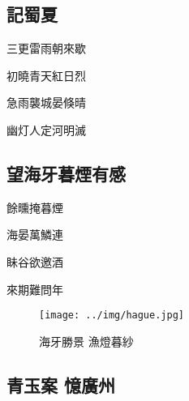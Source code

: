 \documentclass[a4j,12pt]{ltjtarticle}
\begin{document}
\begin{center}
	\newpage
	\begin{flushleft}
		\section{記蜀夏}
	\end{flushleft}
	
	\vfill
	\LARGE 三更雷雨朝來歇\par

	初曉青天紅日烈\par 

	急雨襲城晏倏晴\par

	幽灯人定河明滅\par
	\vspace{1.5cm} %
	\vfill





	\newpage
	\begin{flushleft}
		\section{望海牙暮煙有感}
	\end{flushleft}
	
	\vfill
	\LARGE 餘曛掩暮煙\par 
		海晏萬鱗連\par 
		眛谷欲邀酒\par 
		來期難問年\par 
	\vspace{1.5cm} %
	\vfill


	\newpage
	\vfill
	\begin{figure}[h!]
		\centering
		\texttt{[image: ../img/hague.jpg]}

		\caption{海牙勝景 漁燈暮紗}
		\label{fig:hague}
	\end{figure}
	\vfill



	\newpage
	\begin{flushleft}
		\section{青玉案 憶廣州}
	\end{flushleft}
	

\end{center}
\end{document}
